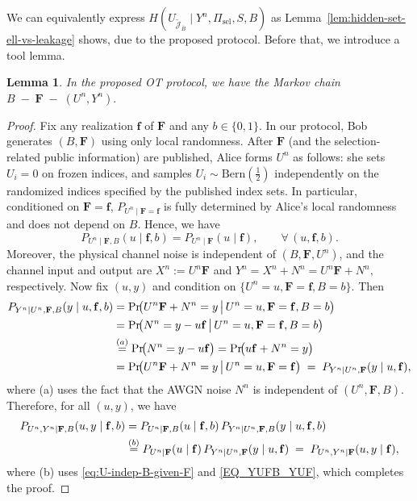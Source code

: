 \documentclass[onecolumn]{IEEEtran} %
\newcommand{\1}{\mathbbm{1}}
\theoremstyle{boldremark}
\newtheorem{lemma}{Lemma}
\begin{document}
We can equivalently express $H(U_{\tilde{\mathcal J}_{\bar{B}}}\mid Y^n,\Pi_{\mathrm{sel}},S,B)$
as Lemma~\ref{lem:hidden-set-ell-vs-leakage} shows, due to the proposed protocol.
Before that, we introduce a tool lemma.


\begin{lemma}\label{lem:markov-B-F-UY}
In the proposed OT protocol, we have the Markov chain
$ B\;-\;\mathbf F\;-\;(U^n,Y^n).$
\end{lemma}

\begin{proof}
Fix any realization $\mathbf f$ of $\mathbf F$ and any $b\in\{0,1\}$.
In our protocol, Bob generates $(B,\mathbf F)$ using only local randomness.
After $\mathbf F$ (and the selection-related public information) are published, Alice forms $U^n$ as follows:
she sets $U_i=0$ on frozen indices, and samples $U_i\sim\mathrm{Bern}(\tfrac12)$ independently on the randomized indices
specified by the published index sets. In particular, conditioned on $\mathbf F=\mathbf f$, 
$P_{U^n\mid \mathbf F=\mathbf f}$ is fully determined by Alice's local randomness and does not depend on $B$. Hence, we have
\begin{equation}\label{eq:U-indep-B-given-F}
P_{U^n\mid \mathbf F,B}(u\mid \mathbf f,b)=P_{U^n\mid \mathbf F}(u\mid \mathbf f),
\qquad \forall\,(u,\mathbf f,b).
\end{equation}
Moreover, the physical channel noise is independent of $(B,\mathbf F,U^n)$, and
the channel input and output are $X^n:=U^n\mathbf F$ and $Y^n = X^n + N^n = U^n\mathbf F + N^n,$ respectively.
Now fix $(u,y)$ and condition on $\{U^n=u,\mathbf F=\mathbf f,B=b\}$. Then
\begin{align}
P_{Y^n\mid U^n,\mathbf F,B}(y\mid u,\mathbf f,b)
&=\Pr\!\bigl(U^n\mathbf F+N^n=y \,\big|\, U^n=u,\mathbf F=\mathbf f,B=b\bigr)\notag\\
&=\Pr\!\bigl(N^n=y-u\mathbf f \,\big|\, U^n=u,\mathbf F=\mathbf f,B=b\bigr)\notag\\
&\overset{(a)}{=}\Pr\!\bigl(N^n=y-u\mathbf f\bigr)
=\Pr\!\bigl(u\mathbf f+N^n=y\bigr)\notag\\
&=\Pr\!\bigl(U^n\mathbf F+N^n=y \,\big|\, U^n=u,\mathbf F=\mathbf f\bigr)
\;=\;P_{Y^n\mid U^n,\mathbf F}(y\mid u,\mathbf f),
\label{EQ_YUFB_YUF}
\end{align}
where (a) uses the fact that the AWGN noise $N^n$ is independent of $(U^n,\mathbf F,B)$. Therefore, for all $(u,y)$, we have
\begin{align}
P_{U^n,Y^n\mid \mathbf F,B}(u,y\mid \mathbf f,b)
&=P_{U^n\mid \mathbf F,B}(u\mid \mathbf f,b)\,P_{Y^n\mid U^n,\mathbf F,B}(y\mid u,\mathbf f,b)\notag\\
&\overset{(b)}{=}P_{U^n\mid \mathbf F}(u\mid \mathbf f)\,P_{Y^n\mid U^n,\mathbf F}(y\mid u,\mathbf f)
\;=\;P_{U^n,Y^n\mid \mathbf F}(u,y\mid \mathbf f),
\label{EQ_UY_FB_UY_F}
\end{align}
where (b) uses \eqref{eq:U-indep-B-given-F} and \eqref{EQ_YUFB_YUF}, which completes the proof.
\end{proof}
\end{document}

